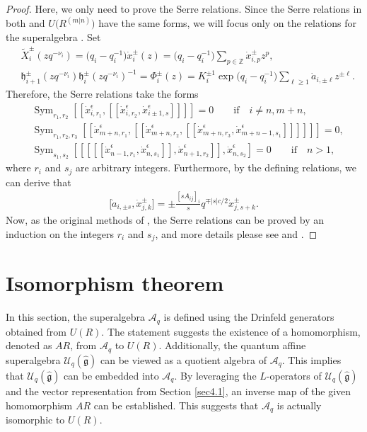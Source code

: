 \documentclass[pdftex]{sigma}
\numberwithin{equation}{section}
\begin{document}
\begin{proof} Here, we only need to prove the Serre relations. Since the Serre relations in both  and $U\bigl(R^{(m|n)}\bigr) $ have the same forms, we will focus only on the relations for the superalgebra . Set
\begin{align*}
 &\widetilde{X}_i^{\pm}(zq^{-\nu_i})=\bigl(q_i-q_i^{-1}\bigr)\dot{x}_i^{\pm}(z)=\bigl(q_i-q_i^{-1}\bigr)\sum_{p\in\mathbb{Z}}\dot{x}_{i,p}^{\pm}z^{p},\\
 &\mathfrak{h}_{i+1}^{\pm}(zq^{-\nu_i})\mathfrak{h}_{i}^{\pm}(zq^{-\nu_i})^{-1}=\Phi^{\pm}_{i}(z)=K_i^{\pm 1}\exp\bigl(q_i-q_i^{-1}\bigr)\sum\limits_{\ell\geq 1}\dot{a}_{i,\pm \ell}z^{\pm \ell}.
\end{align*}
Therefore, the Serre relations take the forms
\begin{align*}
 &\operatorname{Sym}_{r_1,r_2}[\![\dot{x}_{i,r_1}^{\epsilon},[\![\dot{x}_{i,r_2}^{\epsilon}, \dot{x}_{i\pm 1,s}^{\epsilon}]\!] ]\!]=0\qquad\textrm{if}\quad i\neq n,m+n, \\
&\operatorname{Sym}_{r_1,r_2,r_3}[\![\dot{x}_{m+n,r_1}^{\epsilon}, [\![\dot{x}_{m+n,r_2}^{\epsilon},[\![\dot{x}_{m+n,r_3}^{\epsilon}, \dot{x}_{m+n-1,s_1}^{\epsilon}]\!] ]\!] ]\!]=0, \\
&\operatorname{Sym}_{s_1,s_2}[ [\![ [\![\dot{x}_{n-1,r_1}^{\epsilon}, \dot{x}_{n,s_1}^{\epsilon}]\!], \dot{x}_{n+1,r_2}^{\epsilon}]\!], \dot{x}_{n,s_2}^{\epsilon}]=0
\qquad\textrm{if}\quad n>1,
\end{align*}
where $r_i$ and $s_j$ are arbitrary integers. Furthermore, by the defining relations,
 we can derive that
\begin{gather*}
 \bigl[\dot{a}_{i,\pm s}, \dot{x}_{j,k}^{\pm}\bigr]=\pm\frac{[sA_{ij}]_{i}}{s}q^{\mp|s|c/2}\dot{x}_{j,s+k}^{\pm}.
\end{gather*}
Now, as the original methods of \cite{SZLO}, the Serre relations can be proved by an induction on the integers $r_i$ and $s_j$, and more details please see \cite[Section 5.1]{XWLHZ} and \cite[Section 4]{LYZ}.
\end{proof}




\section{Isomorphism theorem }\label{sec6}

In this section, the superalgebra $\mathcal{A}_q$ is defined using the Drinfeld generators obtained from $U(R)$. The statement suggests the existence of a homomorphism, denoted as $AR$, from $\mathcal{A}_q$ to $U(R)$. Additionally, the quantum affine superalgebra $\mathcal{U}_q(\mathfrak{\hat{g}})$ can be viewed as a quotient algebra of $\mathcal{A}_q$. This implies that $\mathcal{U}_q(\mathfrak{\hat{g}})$ can be embedded into $\mathcal{A}_q$. By leveraging the $L$-operators of $\mathcal{U}_q(\mathfrak{\hat{g}})$ and the vector representation from Section \ref{sec4.1}, an inverse map of the given homomorphism $AR$ can be established. This suggests that $\mathcal{A}_q$ is actually isomorphic to $U(R)$.
\end{document}
